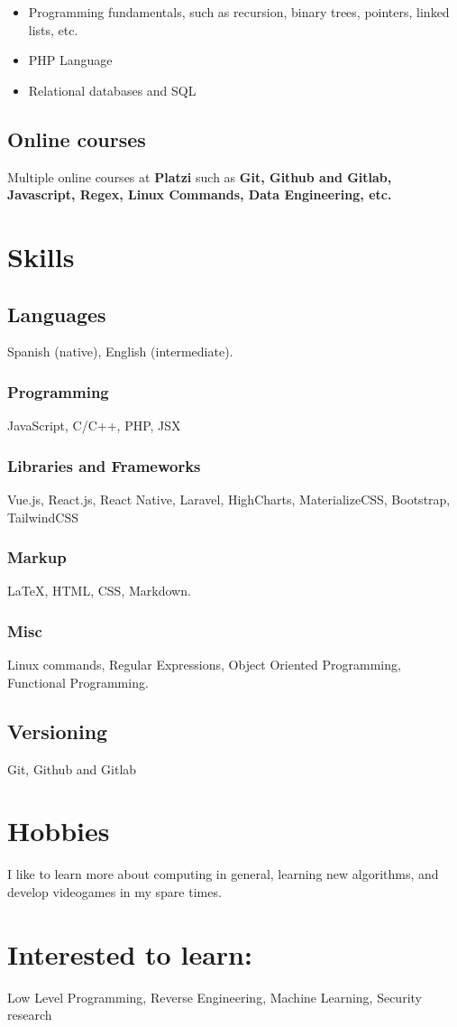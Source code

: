 \documentclass{article}
\begin{document}
\begin{itemize}
    \item Programming fundamentals, such as recursion, binary trees, pointers, linked lists, etc.
    \item PHP Language
    \item Relational databases and SQL
\end{itemize}

\subsection{Online courses}

Multiple online courses at \textbf{Platzi} such as \textbf{Git, Github and Gitlab, Javascript, Regex, Linux Commands, Data Engineering, etc.}

\section{Skills}

\subsection{Languages}

Spanish (native), English (intermediate).

\subsubsection{Programming}

JavaScript, C/C++, PHP, JSX

\subsubsection{Libraries and Frameworks}

Vue.js, React.js, React Native, Laravel, HighCharts, MaterializeCSS, Bootstrap, TailwindCSS

\subsubsection{Markup}

{\LaTeX}, HTML, CSS, Markdown.

\subsubsection{Misc}

Linux commands, Regular Expressions, Object Oriented Programming, Functional Programming.

\subsection{Versioning}

Git, Github and Gitlab

\section{Hobbies}

I like to learn more about computing in general, learning new algorithms, and develop videogames in my spare times.

\section{Interested to learn:}

Low Level Programming, Reverse Engineering, Machine Learning, Security research
\end{document}
